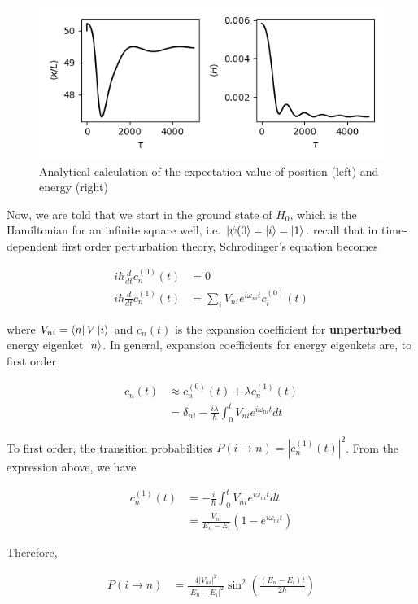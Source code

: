 \documentclass[12pt]{article}
\theoremstyle{definition}
\begin{document}
{\begin{figure}
\includegraphics[scale=1]{Figure_3.png}
\centering
\caption{Analytical calculation of the expectation value of position (left) and energy (right)}
\end{figure}

Now, we are told that we start in the ground state of $H_{0}$, which is the Hamiltonian for an infinite square well, i.e. $\ket{\psi(0} = \ket{i} = \ket{1}$. recall that in time-dependent first order perturbation theory, Schrodinger's equation becomes

\begin{align*}
i\hbar\frac{d}{dt}c_{n}^{(0)}(t) &= 0\\
i\hbar\frac{d}{dt}c_{n}^{(1)}(t) &= \sum_{i}V_{ni}e^{i\omega_{ni}t}c_{i}^{(0)}(t)
\end{align*}

where $V_{ni} = \bra{n}V\ket{i}$ and $c_{n}(t)$ is the expansion coefficient for \textbf{unperturbed} energy eigenket $\ket{n}$. In general, expansion coefficients for energy eigenkets are, to first order

\begin{align*}
c_{n}(t) &\approx c_{n}^{(0)}(t) + \lambda c_{n}^{(1)}(t)\\
&= \delta_{ni} - \frac{i\lambda}{\hbar}\int_{0}^{t}V_{ni}e^{i\omega_{ni}t}dt
\end{align*}

To first order, the transition probabilities $P(i\rightarrow n) = |c_{n}^{(1)}(t)|^{2}$. From the expression above, we have

\begin{align*}
c_{n}^{(1)}(t) &= -\frac{i}{\hbar}\int_{0}^{t}V_{ni} e^{i\omega_{ni}t}dt\\
&= \frac{V_{ni}}{E_{n}-E_{i}}(1-e^{i\omega_{ni}t})
\end{align*}

Therefore,

\begin{align}
P(i\rightarrow n) &= \frac{4|V_{ni}|^{2}}{|E_{n}-E_{i}|^{2}}\sin^{2}\left(\frac{(E_{n}-E_{i})t}{2\hbar}\right)
\end{align}

}
\end{document}
